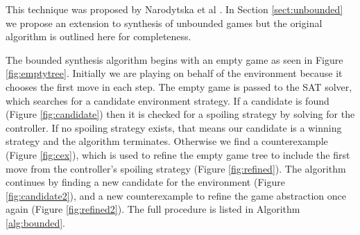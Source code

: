\documentclass{llncs}
\begin{document}
This technique was proposed by Narodytska et al \cite{narodytska2014}. In
Section \ref{sect:unbounded} we propose an extension to synthesis of unbounded
games but the original algorithm is outlined here for completeness.

The bounded synthesis algorithm begins with an empty game as seen in Figure
\ref{fig:emptytree}.  Initially we are playing on behalf of the environment
because it chooses the first move in each step.  The empty game is passed to
the SAT solver, which searches for a candidate environment strategy.  If a
candidate is found (Figure \ref{fig:candidate}) then it is checked for a
spoiling strategy by solving for the controller.  If no spoiling strategy
exists, that means our candidate is a winning strategy and the algorithm
terminates.  Otherwise we find a counterexample (Figure \ref{fig:cex}), which
is used to refine the empty game tree to include the first move from the
controller's spoiling strategy (Figure \ref{fig:refined}).  The algorithm
continues by finding a new candidate for the environment (Figure
\ref{fig:candidate2}), and a new counterexample to refine the game abstraction
once again (Figure \ref{fig:refined2}). The full procedure is listed in
Algorithm \ref{alg:bounded}.
\end{document}
